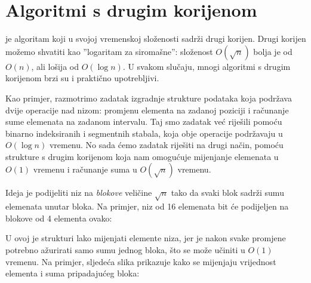 \chapter{Algoritmi s drugim korijenom}


 je algoritam
koji u svojoj vremenskoj složenosti sadrži drugi korijen.
Drugi korijen možemo shvatiti kao ''logaritam za siromašne'':
složenost $O(\sqrt n)$ bolja je od $O(n)$,
ali lošija od $O(\log n)$.
U svakom slučaju, mnogi algoritmi s drugim korijenom brzi su i praktično upotrebljivi.

Kao primjer, razmotrimo zadatak
izgradnje strukture podataka koja podržava
dvije operacije nad nizom:
promjenu elementa na zadanoj poziciji
i računanje sume elemenata na zadanom intervalu.
Taj smo zadatak već riješili pomoću
binarno indeksiranih i segmentnih stabala,
koja obje operacije podržavaju u $O(\log n)$ vremenu.
No sada ćemo zadatak riješiti
na drugi način, pomoću strukture s drugim korijenom
koja nam omogućuje mijenjanje elemenata u $O(1)$ vremenu
i računanje suma u $O(\sqrt n)$ vremenu.

Ideja je podijeliti niz na \emph{blokove}
veličine $\sqrt n$ tako da svaki blok sadrži
sumu elemenata unutar bloka.
Na primjer, niz od 16 elemenata bit će
podijeljen na blokove od 4 elementa ovako:

\begin{center}
\end{center}

U ovoj je strukturi
lako mijenjati elemente niza,
jer je nakon svake promjene
potrebno ažurirati samo
sumu jednog bloka,
što se može učiniti u $O(1)$ vremenu.
Na primjer, sljedeća slika prikazuje
kako se mijenjaju vrijednost elementa i
suma pripadajućeg bloka:

